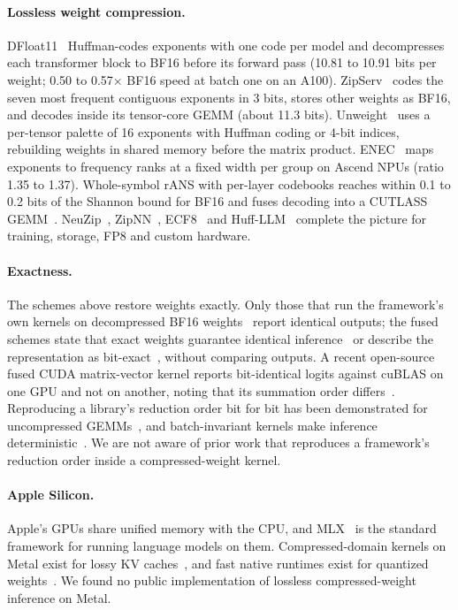 \documentclass[11pt]{article}
\newcommand{\x}{$\times$}
\begin{document}
\paragraph{Lossless weight compression.} DFloat11~\citep{dfloat11} Huffman-codes exponents with one code per model and decompresses each transformer block to BF16 before its forward pass (10.81 to 10.91 bits per weight; 0.50 to 0.57\x{} BF16 speed at batch one on an A100). ZipServ~\citep{zipserv} codes the seven most frequent contiguous exponents in 3 bits, stores other weights as BF16, and decodes inside its tensor-core GEMM (about 11.3 bits). Unweight~\citep{unweight} uses a per-tensor palette of 16 exponents with Huffman coding or 4-bit indices, rebuilding weights in shared memory before the matrix product. ENEC~\citep{enec} maps exponents to frequency ranks at a fixed width per group on Ascend NPUs (ratio 1.35 to 1.37). Whole-symbol rANS with per-layer codebooks reaches within 0.1 to 0.2 bits of the Shannon bound for BF16 and fuses decoding into a CUTLASS GEMM~\citep{shannon}. NeuZip~\citep{neuzip}, ZipNN~\citep{zipnn}, ECF8~\citep{ecf8} and Huff-LLM~\citep{huffllm} complete the picture for training, storage, FP8 and custom hardware.

\paragraph{Exactness.} The schemes above restore weights exactly. Only those that run the framework's own kernels on decompressed BF16 weights~\citep{dfloat11,ecf8} report identical outputs; the fused schemes state that exact weights guarantee identical inference~\citep{shannon,huffllm} or describe the representation as bit-exact~\citep{zipserv,unweight}, without comparing outputs. A recent open-source fused CUDA matrix-vector kernel reports bit-identical logits against cuBLAS on one GPU and not on another, noting that its summation order differs~\citep{nwc}. Reproducing a library's reduction order bit for bit has been demonstrated for uncompressed GEMMs~\citep{taming}, and batch-invariant kernels make inference deterministic~\citep{thinkingmachines}. We are not aware of prior work that reproduces a framework's reduction order inside a compressed-weight kernel.

\paragraph{Apple Silicon.} Apple's GPUs share unified memory with the CPU, and MLX~\citep{mlx} is the standard framework for running language models on them. Compressed-domain kernels on Metal exist for lossy KV caches~\citep{opentq}, and fast native runtimes exist for quantized weights~\citep{basert}. We found no public implementation of lossless compressed-weight inference on Metal.
\end{document}
